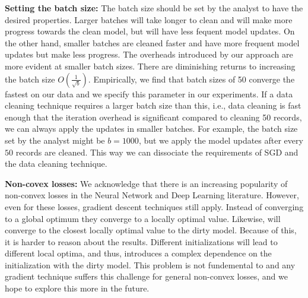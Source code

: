 \vspace{0.5em}

\noindent\textbf{ Setting the batch size: } The batch size should be set by the analyst to have the desired properties.
Larger batches will take longer to clean and will make more progress towards the clean model, but will have less fequent model updates.
On the other hand, smaller batches are cleaned faster and have more frequent model updates but make less progress.
The overheads introduced by our approach are more evident at smaller batch sizes.
There are diminishing returns to increasing the batch size $O(\frac{1}{\sqrt{b}})$.
Empirically, we find that batch sizes of 50 converge the fastest on our data and we specify this parameter in our experiments.
If a data cleaning technique requires a larger batch size than this, i.e., data cleaning is fast enough that the iteration overhead is significant compared to cleaning 50 records, we can always apply the updates in smaller batches.
For example, the batch size set by the analyst might be $b=1000$, but we apply the model updates after every $50$ records are cleaned.
This way we can dissociate the requirements of SGD and the data cleaning technique.

\vspace{0.5em}

\noindent\textbf{ Non-covex losses: } We acknowledge that there is an increasing popularity of non-convex losses in the Neural Network and Deep Learning literature. 
However, even for these losses, gradient descent techniques still apply. 
Instead of converging to a global optimum they converge to a locally optimal value. 
Likewise, \sys will converge to the closest locally optimal value to the dirty model. 
Because of this, it is harder to reason about the results.
Different initializations will lead to different local optima, and thus, introduces a complex dependence on the initialization with the dirty model.
This problem is not fundemental to \sys and any gradient technique suffers this challenge for general non-convex losses, and we hope to explore this more in the future.


